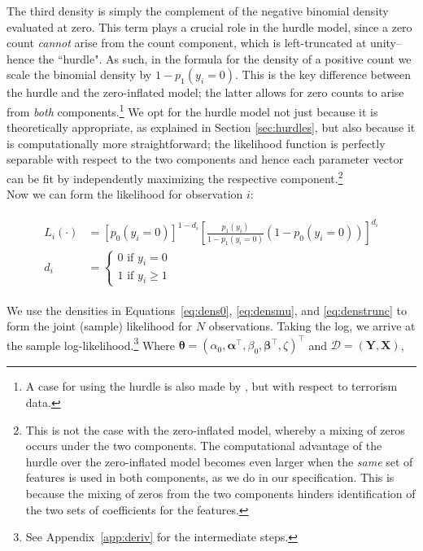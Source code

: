 \documentclass[12pt]{article}
\newcommand{\X}{\mathbf{X}}
\newcommand{\Y}{\mathbf{Y}}
\renewcommand{\r}{\right}
\renewcommand{\l}{\left}
\newcommand{\bbeta}{\bm{\beta}}
\newcommand{\balpha}{\bm{\alpha}}
\newcommand{\btheta}{\bm{\theta}}
\begin{document}
The third density is simply the complement of the negative binomial density evaluated at zero. This term plays a crucial role in the hurdle model, since a zero count \textit{cannot} arise from the count component, which is left-truncated at unity--hence the ``hurdle". As such, in the formula for the density of a positive count we scale the binomial density by $1 - p_1(y_i = 0)$. This is the key difference between the hurdle and the zero-inflated model; the latter allows for zero counts to arise from \textit{both} components.\footnote{A case for using the hurdle is also made by \cite{Porter2012}, but with respect to terrorism data.} We opt for the hurdle model not just because it is theoretically appropriate, as explained in Section \ref{sec:hurdles}, but also because it is computationally more straightforward; the likelihood function is perfectly separable with respect to the two components and hence each parameter vector can be fit by independently maximizing the respective component.\footnote{This is not the case with the zero-inflated model, whereby a mixing of zeros occurs under the two components. The computational advantage of the hurdle over the zero-inflated model becomes even larger when the \textit{same} set of features is used in both components, as we do in our specification. This is because the mixing of zeros from the two components hinders identification of the two sets of coefficients for the features.} 	\\

Now we can form the likelihood for observation $i$:

\begin{align}
 \label{eq:likelihood}
\begin{split}
  L_i(\cdot) &= \l[ p_0(y_i = 0) \r]^{1 - d_i} \l[ \frac{p_1(y_i)}{1 - p_1(y_ i = 0)} (1 - p_0(y_i = 0)) \r]^{d_i}
  \\ d_i &= \begin{cases}
                               0 \text{ if } y_i = 0 \\
                               1 \text{ if } y_i \geq 1
                             \end{cases}
\end{split}
\end{align} 

We use the densities in Equations~\ref{eq:dens0}, \ref{eq:densmu}, and \ref{eq:denstrunc} to form the joint (sample) likelihood for $N$ observations. Taking the log, we arrive at the sample log-likelihood.\footnote{See Appendix~\ref{app:deriv} for the intermediate steps.} Where $\btheta = (\alpha_0, \balpha^\top, \beta_0, \bbeta^\top, \zeta)^\top$ and $\mathcal{D} = (\Y, \X)$,
\end{document}
